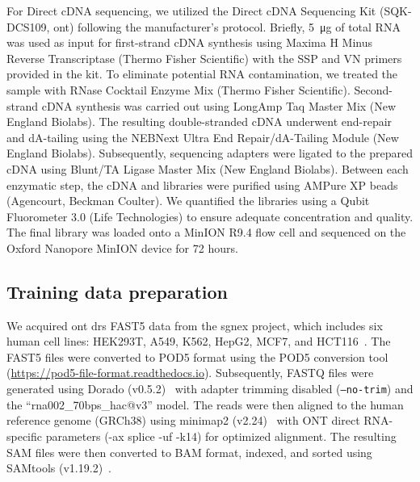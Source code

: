 \documentclass[pdflatex,sn-nature, lineno]{sn-jnl}%
\begin{document}
For Direct cDNA sequencing, we utilized the Direct cDNA Sequencing Kit (SQK-DCS109, \gls{ont}) following the manufacturer's protocol.
Briefly, \SI{5}{\micro\gram}  of total RNA was used as input for first-strand cDNA synthesis using Maxima H Minus Reverse Transcriptase (Thermo Fisher Scientific) with the SSP and VN primers provided in the kit.
To eliminate potential RNA contamination, we treated the sample with RNase Cocktail Enzyme Mix (Thermo Fisher Scientific).
Second-strand cDNA synthesis was carried out using LongAmp Taq Master Mix (New England Biolabs).
The resulting double-stranded cDNA underwent end-repair and dA-tailing using the NEBNext Ultra End Repair/dA-Tailing Module (New England Biolabs).
Subsequently, sequencing adapters were ligated to the prepared cDNA using Blunt/TA Ligase Master Mix (New England Biolabs).
Between each enzymatic step, the cDNA and libraries were purified using AMPure XP beads (Agencourt, Beckman Coulter).
We quantified the libraries using a Qubit Fluorometer 3.0 (Life Technologies) to ensure adequate concentration and quality.
The final library was loaded onto a MinION R9.4 flow cell and sequenced on the Oxford Nanopore MinION device for 72 hours.

\subsection{Training data preparation}\label{ssec:data}

We acquired \gls{ont} \gls{drs} FAST5 data from the \gls{sgnex} project, which includes six human cell lines: HEK293T, A549, K562, HepG2, MCF7, and HCT116~\cite{chen2021systematic}.
The FAST5 files were converted to POD5 format using the POD5 conversion tool (\url{https://pod5-file-format.readthedocs.io}).
Subsequently, FASTQ files were generated using Dorado (v0.5.2)~\cite{dorado2023} with adapter trimming disabled (\texttt{--no-trim}) and the ``rna002\_70bps\_hac@v3'' model.
The reads were then aligned to the human reference genome (GRCh38) using minimap2 (v2.24)~\cite{li2018minimap2} with ONT direct RNA-specific parameters (-ax splice -uf -k14) for optimized alignment. The resulting SAM files were then converted to BAM format, indexed, and sorted using SAMtools (v1.19.2)~\cite{li2009sequence}.
\end{document}
